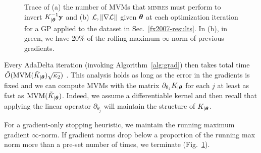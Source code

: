 \documentclass{article}
\begin{document}
\begin{figure}[!h]
\begin{center}
\end{center}
\caption{Trace of (a) the number of MVMs that \textsc{minres} must perform to invert $K_{|{\boldsymbol\theta}}^{-1}\textbf{y}$ and (b) $\mathcal{L}, \left\| \nabla\mathcal{L} \right\|$ given ${\boldsymbol\theta}$ at each optimization iteration for a GP applied to the dataset in Sec.~\ref{fx2007-results}. In (b), in green, we have 20\% of the rolling maximum $\infty$-norm of previous gradients.
}
\label{fx2007-iterations}
\end{figure}

Every AdaDelta iteration (invoking Algorithm~\ref{alg:grad}) then takes total time $\tilde{O}(\operatorname{MVM}(\tilde{K}_{|{\boldsymbol\theta}})\sqrt{\kappa_2})$ \cite{raykar2007fast}. This analysis holds as long as the error in the gradients is fixed and we can compute MVMs with the matrix $\partial_{\theta_j}K_{|{\boldsymbol\theta}}$ for each $j$ at least as fast as $\operatorname{MVM}({\tilde{K}_{|{\boldsymbol\theta}}})$. Indeed, we assume a differentiable kernel and then recall that applying the linear operator $\partial_{\theta_j}$ will maintain the structure of $K_{|{\boldsymbol\theta}}$.

For a gradient-only stopping heuristic, we maintain the running maximum gradient $\infty$-norm. If gradient norms drop below a proportion of the running max norm more than a pre-set number of times, we terminate (Fig.~\ref{fx2007-iterations}).
\end{document}
